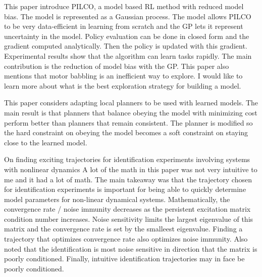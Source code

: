 \documentclass[12 pt]{article}
\begin{document}
This paper introduce PILCO, a model based RL method with reduced model bias. The model is represented as a Gaussian process. The model allows PILCO to be very data-efficient in learning from scratch and the GP lets it represent uncertainty in the model. Policy evaluation can be done in closed form and the gradient computed analytically. Then the policy is updated with this gradient. Experimental results show that the algorithm can learn tasks rapidly. The main contribution is the reduction of model bias with the GP. This paper also mentions that motor babbling is an inefficient way to explore. I would like to learn more about what is the best exploration strategy for building a model. \cite{deisenroth2011pilco}

This paper considers adapting local planners to be used with learned models. The main result is that planners that balance obeying the model with minimizing cost perform better than planners that remain consistent. The planner is modified so the hard constraint on obeying the model becomes a soft constraint on staying close to the learned model.\cite{atkeson1997nonparametric}

On finding exciting trajectories for identification experiments involving systems with nonlinear dynamics \cite{armstrong1987find}
A lot of the math in this paper was not very intuitive to me and it had a lot of math. The main takeaway was that the trajectory chosen for identification experiments is important for being able to quickly determine model parameters for non-linear dynamical systems. Mathematically, the convergence rate / noise immunity decreases as the persistent excitation matrix condition number increases. Noise sensitivity limits the largest eigenvalue of this matrix and the convergence rate is set by the smalleest eigenvalue. Finding a trajectory that optimizes convergence rate also optimizes noise immunity. Also noted that the identification is most noise sensitive in direction that the matrix is poorly conditioned. Finally, intuitive identification trajectories may in face be poorly conditioned.




\end{document}
